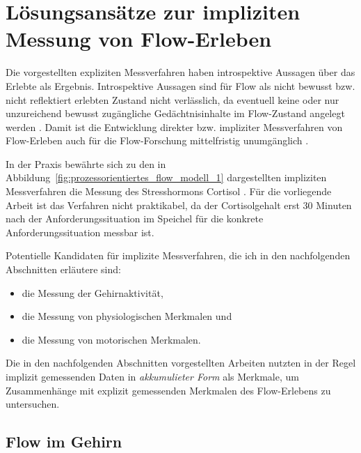 

\section{Lösungsansätze zur impliziten Messung von Flow-Erleben} 

\label{sec:losungsansatze_zur_impliziten_messung_von_flow_erleben}

Die vorgestellten expliziten Messverfahren haben introspektive Aussagen über das Erlebte als Ergebnis. Introspektive Aussagen sind für Flow als nicht bewusst bzw. nicht reflektiert erlebten Zustand nicht verlässlich, da eventuell keine oder nur unzureichend bewusst zugängliche Gedächtnisinhalte im Flow-Zustand angelegt werden \citep[][S.~82]{Henk2014}. Damit ist die Entwicklung direkter bzw. impliziter Messverfahren von Flow-Erleben auch für die Flow-Forschung mittelfristig unumgänglich \citep[][S.~86]{Henk2014}.

In der Praxis bewährte sich zu den in Abbildung~\ref{fig:prozessorientiertes_flow_modell_1} dargestellten impliziten Messverfahren die Messung des Stresshormons Cortisol \citep{Keller2011, Peifer2014, Peifer2015}. Für die vorliegende Arbeit ist das Verfahren nicht praktikabel, da der Cortisolgehalt erst 30 Minuten nach der Anforderungssituation im Speichel für die konkrete Anforderungssituation messbar ist. 

Potentielle Kandidaten für implizite Messverfahren, die ich in den nachfolgenden Abschnitten erläutere sind: 
\begin{itemize}
	
	\item die Messung der Gehirnaktivität,
	
	\item die Messung von physiologischen Merkmalen und
	
	\item die Messung von motorischen Merkmalen. 
\end{itemize}

Die in den nachfolgenden Abschnitten vorgestellten Arbeiten nutzten in der Regel implizit gemessenden Daten in \emph{akkumulieter Form} als Merkmale, um Zusammenhänge mit explizit gemessenden Merkmalen des Flow-Erlebens zu untersuchen.

\subsection{Flow im Gehirn} 

